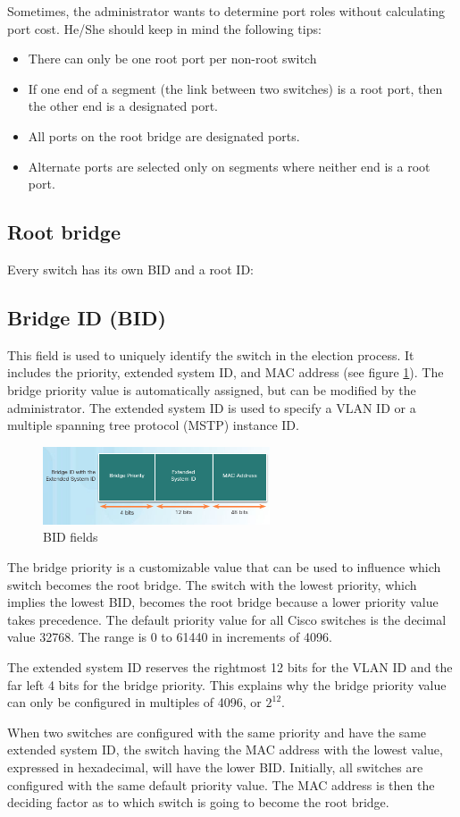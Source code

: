Sometimes, the administrator wants to determine port roles without calculating port cost. He/She should keep in mind the following tips:
\begin{itemize}
\item There can only be one root port per non-root switch
\item If one end of a segment (the link between two switches) is a root port, then the other end is a designated port.
\item All ports on the root bridge are designated ports.
\item Alternate ports are selected only on segments where neither end is a root port.
\end{itemize}
\subsection{Root bridge}
Every switch has its own BID and a root ID:
\subsection{Bridge ID (BID)}
This field is used to uniquely identify the switch in the election process. It includes the priority, extended system ID, and MAC address (see figure \ref{BID}). The bridge priority value is automatically assigned, but can be modified by the administrator. The extended system ID is used to specify a VLAN ID or a multiple spanning tree protocol (MSTP) instance ID. 
\begin{figure}[hbtp]
\centering
\includegraphics[width=0.6\textwidth]{pictures/BID.png}
\caption{BID fields}
\label{BID}
\end{figure}
The bridge priority is a customizable value that can be used to influence which switch becomes the root bridge. The switch with the lowest priority, which implies the lowest BID, becomes the root bridge because a lower priority value takes precedence. The default priority value for all Cisco switches is the decimal value 32768. The range is 0 to 61440 in increments of 4096.\par 
The extended system ID reserves the rightmost 12 bits for the VLAN ID and the far left 4 bits for the bridge priority. This explains why the bridge priority value can only be configured in multiples of 4096, or $2^12$.\par 
When two switches are configured with the same priority and have the same extended system ID, the switch having the MAC address with the lowest value, expressed in hexadecimal, will have the lower BID. Initially, all switches are configured with the same default priority value. The MAC address is then the deciding factor as to which switch is going to become the root bridge. 
